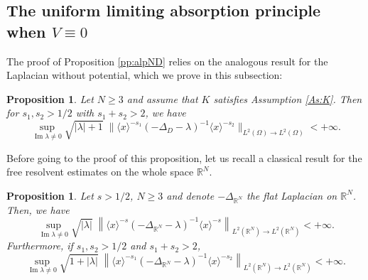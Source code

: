 \documentclass[10pt,leqno]{amsart}
\DeclareMathOperator{\im}{Im} %
\newtheorem{proposition}[theorem]{Proposition}
\theoremstyle{definition}%
\theoremstyle{remark}
\numberwithin{equation}{section}
\renewcommand{\^}{\widehat}%
\begin{document}
\subsection{The uniform limiting absorption principle when $V\equiv 0$}
The proof of Proposition \ref{pp:alpND} relies on the analogous result for the Laplacian without potential, which we prove in this subsection:
\begin{proposition}
	\label{pp:VzeroND}
	Let $N\ge 3$ and assume that $K$ satisfies Assumption \ref{As:K}. Then for $s_1,s_2>1/2$ with $s_1+s_2>2$, we have
	\begin{equation}
	\label{eq:V=0 ND}
	\sup_{\im \lambda \neq 0}
	\sqrt{|\lambda|+1}\;\|\langle x\rangle^{-s_1}(-\Delta_D-\lambda)^{-1}\langle x\rangle^{-s_2}\|_{L^2(\Omega)\to L^2(\Omega)}<+\infty.
	\end{equation}
\end{proposition}
Before going to the proof of this proposition, let us recall a classical result for the free resolvent estimates on the whole space $\mathbb{R}^N$.
\begin{proposition}
	\label{P:BB}
	Let $s>1/2$,  $N\ge 3$ and denote $-\Delta_{\mathbb{R}^N}$ the flat Laplacian on  $\mathbb{R}^N$. Then, we have
\begin{equation}
\label{eq:freeResolvent1}
	\sup_{\im \lambda \neq 0}
\sqrt{|\lambda|}\; \left\|\langle x\rangle^{-s}(-\Delta_{\mathbb{R}^N}-\lambda)^{-1}\langle x\rangle ^{-s}\right\|_{L^2(\mathbb{R}^N)\to L^2(\mathbb{R}^N)}<+\infty.
\end{equation}
Furthermore, if $s_1,s_2>1/2$ and $s_1+s_2>2$,
\begin{equation}
\label{eq:freeResolvent}
	\sup_{\im \lambda \neq 0}
\sqrt{1+|\lambda|}\; \left\|\langle x\rangle^{-s_1}(-\Delta_{\mathbb{R}^N}-\lambda)^{-1}\langle x\rangle ^{-s_2}\right\|_{L^2(\mathbb{R}^N)\to L^2(\mathbb{R}^N)}<+\infty.
\end{equation}
\end{proposition}
\end{document}
